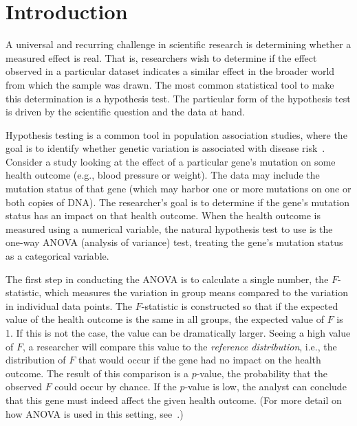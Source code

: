 
\section{Introduction}

A universal and recurring challenge in scientific research is determining whether a measured effect is real.  That is, researchers wish to determine if the effect observed in a particular dataset indicates a similar effect in the broader world from which the sample was drawn. The most common statistical tool to make this determination is a hypothesis test.
The particular form of the hypothesis test is driven by the scientific question and the data at hand. 

Hypothesis testing is a common tool in population association studies, where the goal is to identify whether genetic variation is associated with disease risk~\cite{balding2006tutorial}.  Consider a study looking at the effect of a particular gene's mutation on some health outcome (e.g., blood pressure or weight).  The data may include the mutation status of that gene (which may harbor one or more mutations on one or both copies of DNA).  
The researcher's goal is to determine if the gene's mutation status has an impact on that health outcome.  When the health outcome is measured using a numerical variable, the natural hypothesis test to use is the one-way ANOVA (analysis of variance) test, treating the gene's mutation status as a categorical variable.

The first step in conducting the ANOVA is to calculate a single number, the $F$-statistic, which measures the variation in group means compared to the variation in individual data points. The $F$-statistic is constructed so that if the expected value of the health outcome is the same in all groups, the expected value of $F$ is 1.  If this is not the case, the value can be dramatically larger.  Seeing a high value of $F$, a researcher will compare this value to the \textit{reference distribution}, i.e., the distribution of $F$ that would occur if the gene had no impact on the health outcome.  The result of this comparison is a $p$-value, the probability that the observed $F$ could occur by chance.  If the $p$-value is low, the analyst can conclude that this gene must indeed affect the given health outcome.  (For more detail on how ANOVA is used in this setting, see~\cite{myers2003researchdesign}.)

